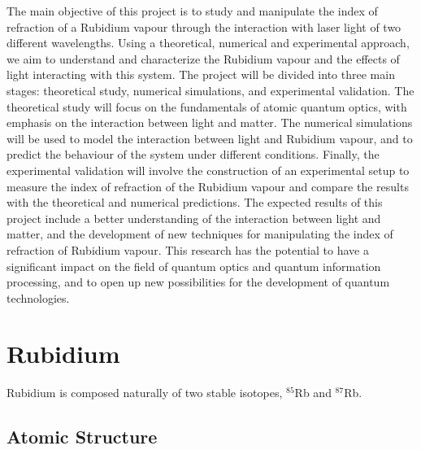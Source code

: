 \documentclass[10pt]{article}
\begin{document}
\noindent The main objective of this project is to study and manipulate the index of refraction of a Rubidium vapour through the interaction with laser light of two different wavelengths. Using a theoretical, numerical and experimental approach, we aim to understand and characterize the Rubidium vapour and the effects of light interacting with this system. The project will be divided into three main stages: theoretical study, numerical simulations, and experimental validation. The theoretical study will focus on the fundamentals of atomic quantum optics, with emphasis on the interaction between light and matter. The numerical simulations will be used to model the interaction between light and Rubidium vapour, and to predict the behaviour of the system under different conditions. Finally, the experimental validation will involve the construction of an experimental setup to measure the index of refraction of the Rubidium vapour and compare the results with the theoretical and numerical predictions. The expected results of this project include a better understanding of the interaction between light and matter, and the development of new techniques for manipulating the index of refraction of Rubidium vapour. This research has the potential to have a significant impact on the field of quantum optics and quantum information processing, and to open up new possibilities for the development of quantum technologies.


\newpage
\section*{Rubidium}
Rubidium is composed naturally of two stable isotopes, $^{85}$Rb and $^{87}$Rb.
\subsection*{Atomic Structure}
\end{document}

